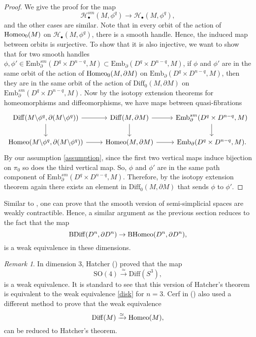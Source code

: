 \documentclass[a4paper]{amsart}
\theoremstyle{definition}
\theoremstyle{remark}
\newtheorem{rem}[thm]{Remark}
\newcommand\Diff{\mathrm{Diff}}
\newcommand\BDiff{\mathrm{BDiff}}
\newcommand\Emb{\mathrm{Emb}}
\newcommand{\tH}{\text{\textnormal{Homeo}}}
\newcommand{\BH}{\mathrm{B}\text{\textnormal{Homeo}}}
\numberwithin{equation}{section}
\begin{document}
\begin{proof} We give the proof for the map 
\[
\mathcal{H}_{\bullet}^{sm}(M,\phi^q)\to \mathcal{H}_{\bullet}(M,\phi^q),
\]
and the other cases are similar. Note that in every orbit of the action of $\tH_0(M)$ on $\mathcal{H}_{\bullet}(M,\phi^q)$, there is a smooth handle. Hence, the induced map between orbits is surjective. To show that it is also injective, we want to show that for two smooth handles $\phi,\phi'\in \Emb_{\partial}^{sm}(D^q\times D^{n-q},M)\subset\Emb_{\partial}(D^q\times D^{n-q},M)$, if $\phi$ and $\phi'$ are in the same orbit of the action of $\tH_0(M,\partial M)$ on $\Emb_{\partial}(D^q\times D^{n-q},M)$, then they are in the same orbit of the action of $\Diff_0(M,\partial M)$ on $\Emb_{\partial}^{sm}(D^q\times D^{n-q},M)$. Now by the isotopy extension theorems for homeomorphisms and diffeomorphisms, we have maps between quasi-fibrations
\[
\begin{tikzcd}
\Diff(M\backslash\phi^q,\partial (M\backslash\phi^q))\arrow{r}\arrow{d}& \Diff(M,\partial M) \arrow{r}\arrow{d}&\Emb_{\partial}^{sm}(D^q\times D^{n-q},M)\arrow{d} \\\tH(M\backslash\phi^q,\partial (M\backslash\phi^q))\arrow[""]{r}& \tH(M,\partial M)\arrow{r}& \Emb_{\partial}(D^q\times D^{n-q},M).
\end{tikzcd}
\]
By our assumption \ref{assumption}, since the first two vertical maps induce bijection on $\pi_0$ so does the third vertical map. So, $\phi$ and $\phi'$ are in the same path component of $ \Emb_{\partial}^{sm}(D^q\times D^{n-q},M)$. Therefore, by the isotopy extension theorem again there exists an element in $\Diff_0(M,\partial M)$ that sends $\phi$ to $\phi'$.
\end{proof}
Similar to , one can prove that the smooth version of semi-simplicial spaces are weakly contractible.  Hence, a similar argument as the previous section reduces   to the fact that the map
\begin{equation}\label{disk}
\BDiff(D^n,\partial D^n)\to \BH(D^n,\partial D^n),
\end{equation}
is a weak equivalence in these dimensions.

\begin{rem} In dimension $3$, Hatcher (\cite{hatcher1983proof}) proved that the map 
\[
\text{SO}(4)\xrightarrow{\simeq}\Diff(S^3),
\]
is a weak equivalence. It is standard to see that this version of Hatcher's theorem is equivalent to the weak equivalence \ref{disk} for $n=3$.  Cerf in (\cite{cerf1961topologie}) also used a different method to prove that the weak equivalence 
\[
\Diff(M)\xrightarrow{\simeq} \tH(M),
\]
can be reduced to  Hatcher's theorem.
\end{rem}
\end{document}
